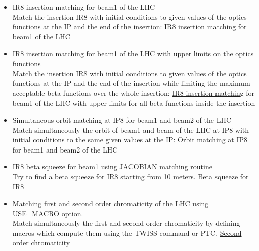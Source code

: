 \begin{itemize}
   \item IR8 insertion matching for beam1 of the LHC\\
     Match the insertion IR8 with initial conditions to given values
     of the optics  functions at the IP and the end of the insertion:
     \href{https://github.com/MethodicalAcceleratorDesign/madx-examples/blob/master/match/lhc.insertion/job.lhc.insertion.madx}
     {IR8 insertion matching} for beam1 of the LHC
     
   \item IR8 insertion matching for beam1 of the LHC with upper
     limits on the optics functions\\
     Match the insertion IR8 with initial conditions to given values
     of the optics  functions at the IP and the end of the insertion
     while limiting the maximum acceptable beta functions over the
     whole insertion:
     \href{https://github.com/MethodicalAcceleratorDesign/madx-examples/blob/master/match/lhc.insertion-upper/job.lhc.insertion-upper.madx}
     {IR8 insertion matching}
     for beam1 of the LHC with upper limits for
     all beta functions inside the insertion
     
   \item Simultaneous orbit matching at IP8 for beam1 and beam2 of
     the LHC\\
     Match simultaneously the orbit of beam1 and beam of the LHC at
     IP8  with initial conditions to the same given values at the IP:
     \href{https://github.com/MethodicalAcceleratorDesign/madx-examples/blob/master/match/lhc.iporbit/job.lhc.iporbit.madx}
     {Orbit matching at IP8} for beam1 and beam2 of the LHC
     
   \item IR8 beta squeeze for beam1 using JACOBIAN matching routine\\
     Try to find a beta squeeze for IR8 starting from 10 meters.
     \href{https://github.com/MethodicalAcceleratorDesign/madx-examples/blob/master/match/lhcV65.ir8squeeze/job.lhcV65.ir8squeeze.madx}
     {Beta squeeze for IR8}
     
   \item Matching first and second order chromaticity of the LHC
     using USE\_MACRO option. \\
     Match simultaneously the first and second order chromaticity by
     defining macros which compute them using the TWISS command or
     PTC.
     \href{https://github.com/MethodicalAcceleratorDesign/madx-examples/blob/master/match/lhc.qpp/job.lhc.qpp.madx}
     {Second order chromaticity}
     

\end{itemize}
